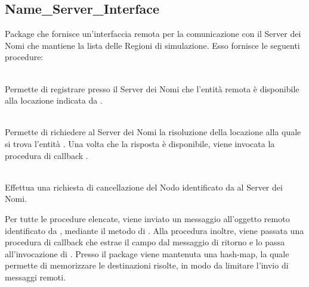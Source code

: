 	\subsection{Name\_Server\_Interface}
	
	Package che fornisce un'interfaccia remota per la comunicazione con il Server dei Nomi che mantiene la lista delle Regioni di simulazione. Esso fornisce le seguenti procedure:
	\begin{description}
		\item {} \\
		
	Permette di registrare presso il Server dei Nomi che l'entità remota  è disponibile alla locazione indicata da . 
	
	\item {} \\

		Permette di richiedere al Server dei Nomi la risoluzione della locazione alla quale si trova l'entità . Una volta che la risposta è disponibile, viene invocata la procedura di callback . 
	
	\item {}\\	
		
		Effettua una richiesta di cancellazione del Nodo identificato da  al Server dei Nomi.
					
	\end{description}
	
	Per tutte le procedure elencate, viene inviato un messaggio all'oggetto remoto identificato da , mediante il metodo  di . Alla procedura  inoltre, viene passata una procedura di callback che estrae il campo  dal messaggio di ritorno e lo passa all'invocazione di . Presso il package viene mantenuta una hash-map, la quale permette di memorizzare le destinazioni risolte, in modo da limitare l'invio di messaggi remoti.
	
